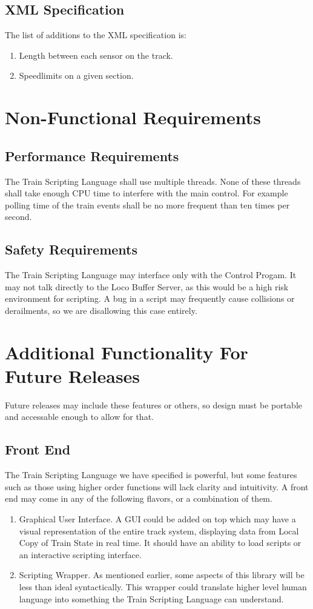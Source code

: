 \documentclass[a4paper,11pt,notitlepage]{article}
\def\TSL{Train Scripting Language\xspace}
\def\CS{Control Progam\xspace}
\def\LC{Local Copy of Train State\xspace}
\begin{document}
\subsection{XML Specification}
    The list of additions to the XML specification is:
\begin{enumerate}
    \item Length between each sensor on the track.
    \item Speedlimits on a given section.
\end{enumerate}

\newpage
\section{Non-Functional Requirements}
\subsection{Performance Requirements}
The \TSL shall use multiple threads. None of these threads shall take enough CPU time to interfere with the main control. For example polling time of the train events shall be no more frequent than ten times per second.

\subsection{Safety Requirements}
The \TSL may interface only with the \CS. It may not talk directly to the Loco Buffer Server, as this would be a high risk environment for scripting. A bug in a script may frequently cause collisions or derailments, so we are disallowing this case entirely.

\newpage
\section{Additional Functionality For Future Releases}
Future releases may include these features or others, so design must be portable and accessable enough to allow for that.
\subsection{Front End}
The \TSL we have specified is powerful, but some features such as those using higher order functions will lack clarity and intuitivity. A front end may come in any of the following flavors, or a combination of them.
\begin{enumerate}
    \item Graphical User Interface. A GUI could be added on top which may have a visual representation of the entire track system, displaying data from \LC in real time. It should have an ability to load scripts or an interactive scripting interface.
    \item Scripting Wrapper. As mentioned earlier, some aspects of this library will be less than ideal syntactically. This wrapper could translate higher level human language into something the \TSL can understand.
\end{enumerate}
\end{document}
